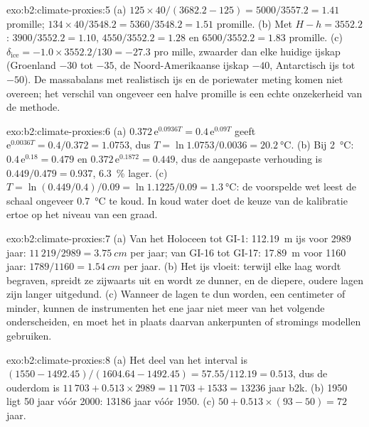\begin{solution}{exo:b2:climate-proxies:5}
(a) $125 \times 40/(3682.2 - 125) = 5000/3557.2 = 1.41$ promille; $134 \times 40/3548.2 =
5360/3548.2 = 1.51$ promille. (b) Met $H - h = 3552.2$: $3900/3552.2 = 1.10$, $4550/3552.2 = 1.28$
en $6500/3552.2 = 1.83$ promille. (c) $\delta_{\mathrm{ice}} = -1.0 \times 3552.2/130 = -27.3$ pro%
mille, zwaarder dan elke huidige ijskap (Groenland $-30$ tot $-35$, de Noord-Amerikaanse ijskap
$-40$, Antarctisch ijs tot $-50$). De massabalans met realistisch ijs en de poriewater%
meting komen niet overeen; het verschil van ongeveer een halve promille is een echte onzekerheid van de methode.
\end{solution}

\begin{solution}{exo:b2:climate-proxies:6}
(a) $0.372\,\mathrm{e}^{0.0936T} = 0.4\,\mathrm{e}^{0.09T}$ geeft $\mathrm{e}^{0.0036T} =
0.4/0.372 = 1.0753$, dus $T = \ln 1.0753/0.0036 = \qty{20.2}{\celsius}$. (b) Bij
\qty{2}{\celsius}: $0.4\,\mathrm{e}^{0.18} = 0.479$ en $0.372\,\mathrm{e}^{0.1872} = 0.449$, dus de
aangepaste verhouding is $0.449/0.479 = 0.937$, \qty{6.3}{\percent} lager. (c) $T = \ln(0.449/0.4)/0.09 =
\ln 1.1225/0.09 = \qty{1.3}{\celsius}$: de voorspelde wet leest de schaal ongeveer
\qty{0.7}{\celsius} te koud. In koud water doet de keuze van de kalibratie ertoe op het niveau van een
graad.
\end{solution}

\begin{solution}{exo:b2:climate-proxies:7}
(a) Van het Holoceen tot GI-1: \qty{112.19}{m} ijs voor 2989 jaar: $11\,219/2989 =
\qty{3.75}{cm}$ per jaar; van GI-16 tot GI-17: \qty{17.89}{m} voor 1160 jaar: $1789/1160 =
\qty{1.54}{cm}$ per jaar. (b) Het ijs
vloeit: terwijl elke laag wordt begraven, spreidt ze zijwaarts uit en wordt ze dunner, en de diepere, oudere lagen zijn
langer uitgedund. (c) Wanneer de lagen te dun worden, een centimeter of minder, kunnen de instrumenten
het ene jaar niet meer van het volgende onderscheiden, en moet het  in plaats daarvan ankerpunten of stromings%
modellen gebruiken.
\end{solution}

\begin{solution}{exo:b2:climate-proxies:8}
(a) Het deel van het interval is $(1550 - 1492.45)/(1604.64 - 1492.45) = 57.55/112.19 = 0.513$,
dus de ouderdom is $11\,703 + 0.513 \times 2989 = 11\,703 + 1533 = \num{13236}$ jaar b2k. (b) 1950 ligt 50
jaar vóór 2000: \num{13186} jaar vóór 1950. (c) $50 + 0.513 \times (93 - 50) = 72$ jaar.
\end{solution}

